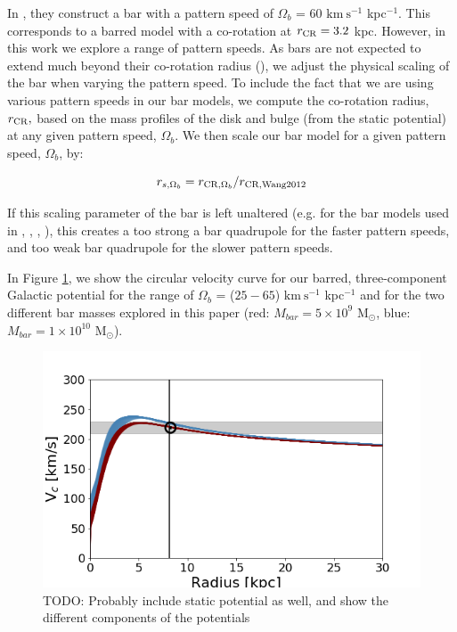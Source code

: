 \documentclass[modern]{aastex62}
\newcommand{\msun}{\textrm{M}_\odot}
\newcommand{\kms}{\ensuremath{\textrm{km}~\textrm{s}^{-1}}}
\newcommand{\todo}[1]{{\color{red} TODO: #1}}
\begin{document}
In \citet{wang:2012}, they construct a bar with a pattern speed of $\Omega_b$ =  60 $\kms$ kpc$^{-1}$. This corresponds to a barred model with a co-rotation at $r_{\rm CR} = 3.2$ kpc. However, in this work we explore a range of pattern speeds. As bars are not expected to extend much beyond their co-rotation radius (\citealt{binney:2008}), we adjust the physical scaling of the bar when varying the pattern speed. %
To include the fact that we are using various pattern speeds in our bar models, we  compute the co-rotation radius, $r_{\rm CR},$ based on the mass profiles of the disk and bulge (from the static potential) at any given pattern speed, $\Omega_b$. We then scale our bar model for a given pattern speed, $\Omega_b$, by:

\begin{equation} 
r_{s, \Omega_b}  = r_{{\rm CR}, \Omega_b}/r_{{\rm CR, Wang 2012}}
\end{equation} 

If this scaling parameter of the bar is left unaltered (e.g. for the bar models used in \citealt{price:2016b}, \citealt{Pearson:2017}, \citealt{Erkal:2017}, \citealt{Banik:2019}), this creates a too strong a bar quadrupole for the faster pattern speeds, and too weak bar quadrupole for the slower pattern speeds. 

In Figure \ref{fig:vcirc}, we show the circular velocity curve for our barred, three-component Galactic potential for the range of  $\Omega_b$ = ($25 - 65$) $\kms$ kpc$^{-1}$ and for the two different bar masses explored in this paper (red: $M_{bar} = 5 \times 10^{9}$ $\msun$, blue: $M_{bar} = 1 \times 10^{10}$ $\msun$).

\begin{figure}
\centerline{\includegraphics[width=\columnwidth]{v_circ_nlm919.png}}
\caption{\todo{Probably include static potential as well, and show the different components of the potentials }}
\label{fig:vcirc}
\end{figure}
\end{document}
